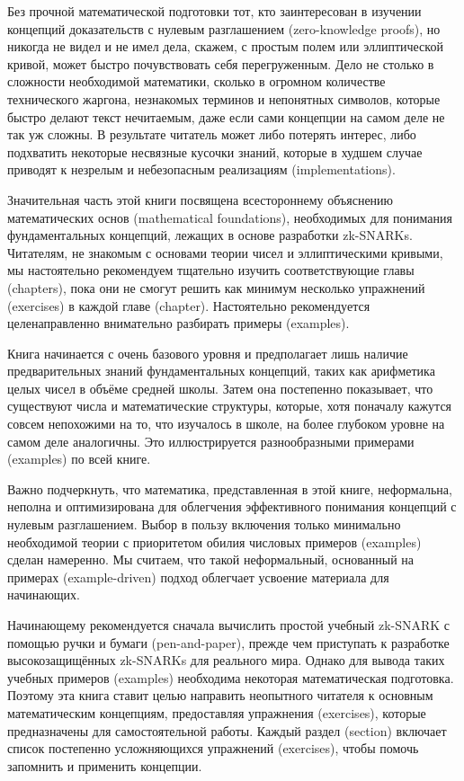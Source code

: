 Без прочной математической подготовки тот, кто заинтересован в изучении концепций доказательств с нулевым разглашением (zero-knowledge proofs), но никогда не видел и не имел дела, скажем, с простым полем или эллиптической кривой, может быстро почувствовать себя перегруженным. Дело не столько в сложности необходимой математики, сколько в огромном количестве технического жаргона, незнакомых терминов и непонятных символов, которые быстро делают текст нечитаемым, даже если сами концепции на самом деле не так уж сложны. В результате читатель может либо потерять интерес, либо подхватить некоторые несвязные кусочки знаний, которые в худшем случае приводят к незрелым и небезопасным реализациям (implementations). 

Значительная часть этой книги посвящена всестороннему объяснению математических основ (mathematical foundations), необходимых для понимания фундаментальных концепций, лежащих в основе разработки zk-SNARKs. Читателям, не знакомым с основами теории чисел и эллиптическими кривыми, мы настоятельно рекомендуем тщательно изучить соответствующие главы (chapters), пока они не смогут решить как минимум несколько упражнений (exercises) в каждой главе (chapter). Настоятельно рекомендуется целенаправленно внимательно разбирать примеры (examples).

Книга начинается с очень базового уровня и предполагает лишь наличие предварительных знаний фундаментальных концепций, таких как арифметика целых чисел в объёме средней школы. Затем она постепенно показывает, что существуют числа и математические структуры, которые, хотя поначалу кажутся совсем непохожими на то, что изучалось в школе, на более глубоком уровне на самом деле аналогичны. Это иллюстрируется разнообразными примерами (examples) по всей книге.

Важно подчеркнуть, что математика, представленная в этой книге, неформальна, неполна и оптимизирована для облегчения эффективного понимания концепций с нулевым разглашением. Выбор в пользу включения только минимально необходимой теории с приоритетом обилия числовых примеров (examples) сделан намеренно. Мы считаем, что такой неформальный, основанный на примерах (example-driven) подход облегчает усвоение материала для начинающих.

Начинающему рекомендуется сначала вычислить простой учебный zk-SNARK с помощью ручки и бумаги (pen-and-paper), прежде чем приступать к разработке высокозащищённых zk-SNARKs для реального мира. Однако для вывода таких учебных примеров (examples) необходима некоторая математическая подготовка. Поэтому эта книга ставит целью направить неопытного читателя к основным математическим концепциям, предоставляя упражнения (exercises), которые предназначены для самостоятельной работы. Каждый раздел (section) включает список постепенно усложняющихся упражнений (exercises), чтобы помочь запомнить и применить концепции.


